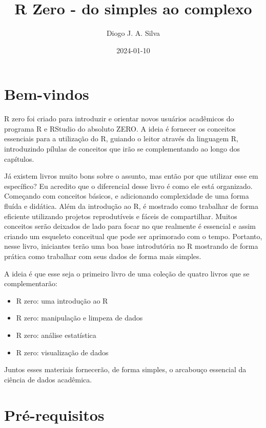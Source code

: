 \documentclass[
]{book}
\title{R Zero - do simples ao complexo}
\author{Diogo J. A. Silva}
\date{2024-01-10}
\providecommand{\tightlist}{%
  \setlength{\itemsep}{0pt}\setlength{\parskip}{0pt}}
\begin{document}
\maketitle

{
\setcounter{tocdepth}{1}
\tableofcontents
}
\hypertarget{bem-vindos}{%
\chapter{Bem-vindos}\label{bem-vindos}}

R zero foi criado para introduzir e orientar novos usuários acadêmicos do programa R e RStudio do absoluto ZERO. A ideia é fornecer os conceitos essenciais para a utilização do R, guiando o leitor através da linguagem R, introduzindo pílulas de conceitos que irão se complementando ao longo dos capítulos.

Já existem livros muito bons sobre o assunto, mas então por que utilizar esse em específico? Eu acredito que o diferencial desse livro é como ele está organizado. Começando com conceitos básicos, e adicionando complexidade de uma forma fluída e didática. Além da introdução ao R, é mostrado como trabalhar de forma eficiente utilizando projetos reprodutíveis e fáceis de compartilhar. Muitos conceitos serão deixados de lado para focar no que realmente é essencial e assim criando um esqueleto conceitual que pode ser aprimorado com o tempo. Portanto, nesse livro, iniciantes terão uma boa base introdutória no R mostrando de forma prática como trabalhar com seus dados de forma mais simples.

A ideia é que esse seja o primeiro livro de uma coleção de quatro livros que se complementarão:

\begin{itemize}
\tightlist
\item
  R zero: uma introdução ao R
\item
  R zero: manipulação e limpeza de dados
\item
  R zero: análise estatística
\item
  R zero: visualização de dados
\end{itemize}

Juntos esses materiais fornecerão, de forma simples, o arcabouço essencial da ciência de dados acadêmica.

\hypertarget{pruxe9-requisitos}{%
\chapter{Pré-requisitos}\label{pruxe9-requisitos}}
\end{document}
